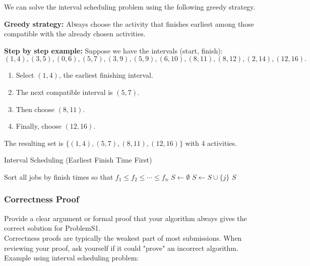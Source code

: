 \documentclass{article}
\begin{document}
We can solve the interval scheduling problem using the following greedy strategy.

\textbf{Greedy strategy:} Always choose the activity that finishes earliest among those compatible with the already chosen activities.  

\textbf{Step by step example:}  
Suppose we have the intervals (start, finish):  
\[
(1,4), (3,5), (0,6), (5,7), (3,9), (5,9), (6,10), (8,11), (8,12), (2,14), (12,16).
\]  
\begin{enumerate}
  \item Select $(1,4)$, the earliest finishing interval.  
  \item The next compatible interval is $(5,7)$.  
  \item Then choose $(8,11)$.  
  \item Finally, choose $(12,16)$.  
\end{enumerate}

The resulting set is $\{(1,4),(5,7),(8,11),(12,16)\}$ with 4 activities. 

\begin{algorithm}[H]
\caption{Interval Scheduling (Earliest Finish Time First)}\label{alg:interval}
\begin{algorithmic}[1]
    \State Sort all jobs by finish times so that $f_1 \leq f_2 \leq \cdots \leq f_n$
    \State $S \gets \emptyset$ 
            \State $S \gets S \cup \{j\}$
        \EndIf
    \EndFor
    \State \Return $S$
\EndProcedure
\end{algorithmic}
\end{algorithm}


\subsubsection{Correctness Proof}
{\color{red} Provide a clear argument or formal proof that your algorithm always gives the correct solution for ProblemS1.\\

Correctness proofs are typically the weakest part of most submissions. When reviewing your proof, ask yourself if it could "prove" an incorrect algorithm.\\

Example using interval scheduling problem:\\}
\end{document}
